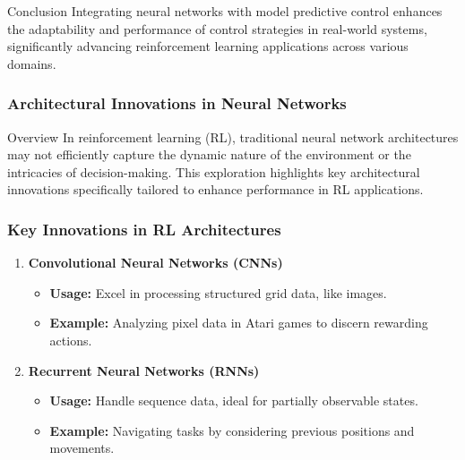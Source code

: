 \documentclass[aspectratio=169]{beamer}
\begin{document}
\begin{frame}{Conclusion}
    Integrating neural networks with model predictive control enhances the adaptability and performance of control strategies in real-world systems, significantly advancing reinforcement learning applications across various domains.
\end{frame}

\begin{frame}[fragile]
    \frametitle{Architectural Innovations in Neural Networks}
    \begin{block}{Overview}
        In reinforcement learning (RL), traditional neural network architectures may not efficiently capture the dynamic nature of the environment or the intricacies of decision-making. This exploration highlights key architectural innovations specifically tailored to enhance performance in RL applications.
    \end{block}
\end{frame}

\begin{frame}[fragile]
    \frametitle{Key Innovations in RL Architectures}
    \begin{enumerate}
        \item \textbf{Convolutional Neural Networks (CNNs)}
            \begin{itemize}
                \item \textbf{Usage:} Excel in processing structured grid data, like images.
                \item \textbf{Example:} Analyzing pixel data in Atari games to discern rewarding actions.
            \end{itemize}
        \item \textbf{Recurrent Neural Networks (RNNs)}
            \begin{itemize}
                \item \textbf{Usage:} Handle sequence data, ideal for partially observable states.
                \item \textbf{Example:} Navigating tasks by considering previous positions and movements.
            \end{itemize}
    \end{enumerate}
\end{frame}
\end{document}
